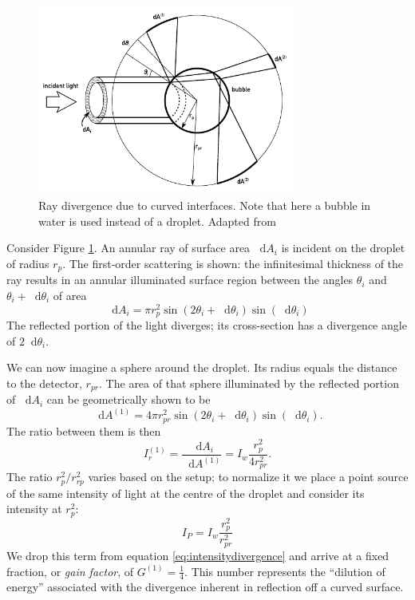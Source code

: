 \documentclass[11.5pt,oneside]{book}
\newcommand*\diff{\mathop{}\!\mathrm{d}}
\begin{document}
\begin{figure}
\centering
\includegraphics[width=0.75\textwidth]{img/scattering/scatterintensity.pdf}
\caption{Ray divergence due to curved interfaces. Note that here a bubble in
water is used instead of a droplet. Adapted from \citet{Albrecht03}}
\label{fig:scatterintensity}
\end{figure}

Consider Figure \ref{fig:scatterintensity}. An annular ray of surface area
$\diff A_i$ is incident on the droplet of radius $r_p$. The first-order scattering is shown: the
infinitesimal thickness of the ray results in an annular illuminated surface
region between the angles $\theta_i$ and $\theta_i + \diff \theta_i$ of area
\begin{equation}
   \diff A_i = \pi r_p^2 \sin(2 \theta_i + \diff \theta_i) \sin(\diff \theta_i)
\end{equation}
The reflected portion of the light diverges; its cross-section has a
divergence angle of $2\diff \theta_i$.

We can now imagine a sphere around the droplet. Its radius equals the distance
to the detector, $r_{pr}$. The area of that sphere illuminated by the reflected
portion of $\diff A_i$ can be geometrically shown to be
\begin{equation}
    \diff A^{(1)} = 4\pi r_{pr}^2 \sin(2\theta_i + \diff \theta_i)\sin(\diff
    \theta_i).
\end{equation}
The ratio between them is then
\begin{equation}
    \label{eq:intensitydivergence}
    I_r^{(1)} = \frac{\diff A_i}{\diff A^{(1)}} = I_w \frac{r_p^2}{4r_{pr}^2}.
\end{equation}
The ratio $r^2_p / r^2_{rp}$ varies based on the setup; to normalize it we
place a point source of the same intensity of light at the centre of the
droplet and consider its intensity at $r^2_p$:
\begin{equation}
    I_P = I_w\frac{r^2_p}{r^2_{pr}}
\end{equation}
We drop this term from equation \eqref{eq:intensitydivergence} and arrive at a
fixed fraction, or \emph{gain factor}, of $G^{(1)} = \frac{1}{4}$. This number
represents the ``dilution of energy'' associated with the divergence inherent in
reflection off a curved surface.
\end{document}
